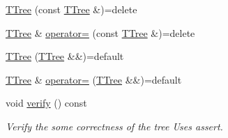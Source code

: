 \begin{DoxyCompactItemize}
\hyperlink{classTTree_ad7fb8543e084eea4a24571f3cb979555}{T\+Tree} (const \hyperlink{classTTree}{T\+Tree} \&)=delete
\item 
\hyperlink{classTTree}{T\+Tree} \& \hyperlink{classTTree_a3c4da2361311ac5903822a2151865ae6}{operator=} (const \hyperlink{classTTree}{T\+Tree} \&)=delete
\item 
\hyperlink{classTTree_acfa1c1f035255298fd22be8810d5d672}{T\+Tree} (\hyperlink{classTTree}{T\+Tree} \&\&)=default
\item 
\hyperlink{classTTree}{T\+Tree} \& \hyperlink{classTTree_a8751a54d1c80d2f822d84a98e5c96293}{operator=} (\hyperlink{classTTree}{T\+Tree} \&\&)=default
\item 
void \hyperlink{classTTree_a561ca642fa6104a2275c30974b57e221}{verify} () const 
\begin{DoxyCompactList}\small\item\em Verify the some correctness of the tree Uses assert. \end{DoxyCompactList}\end{DoxyCompactItemize}
